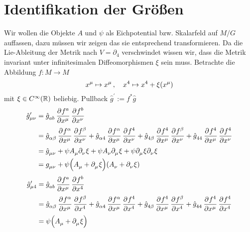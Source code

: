 \section{Identifikation der Größen}
Wir wollen die Objekte $A$ und $\psi$ als Eichpotential bzw. Skalarfeld auf
$M/G$ auffassen, dazu müssen wir zeigen das sie entsprechend transformieren.
Da die Lie-Ableitung der Metrik nach $V=\partial_4$ verschwindet wissen wir,
dass die Metrik invariant unter infinitesimalen Diffeomorphismen $\xi$ sein muss.
Betrachte die Abbildung $f:M\to M$ 
\begin{equation}
\tensor{x}{^\mu}\mapsto
\tensor{x}{^\mu}\,,\quad\tensor{x}{^4}\mapsto\tensor{x}{^4}+
\xi\left(\tensor{x}{^\mu}\right)
\end{equation}
mit $\xi\in C^\infty\left(\Reals\right)$ beliebig. 
Pullback $\hat{g}^\prime:=f^*\hat{g}$
\begin{equation}
\begin{split}
\tensor*{\hat{g}}{*^\prime_\mu_\nu}&=\tensor{\hat{g}}{_a_b}\dpd{f^a}{\tensor{x}{^\mu}}\dpd{f^b}{\tensor{x}{^\nu}}\\
&=\tensor{\hat{g}}{_\alpha_\beta}\dpd{f^\alpha}{\tensor{x}{^\mu}}\dpd{f^\beta}{\tensor{x}{^\nu}}
+\tensor{\hat{g}}{_\alpha_4}\dpd{f^\alpha}{\tensor{x}{^\mu}}\dpd{f^4}{\tensor{x}{^\nu}}
+\tensor{\hat{g}}{_4_\beta}\dpd{f^4}{\tensor{x}{^\mu}}\dpd{f^\beta}{\tensor{x}{^\nu}}
+\tensor{\hat{g}}{_4_4}\dpd{f^4}{\tensor{x}{^\mu}}\dpd{f^4}{\tensor{x}{^\nu}}
\\
&=\tensor{\hat{g}}{_\mu_\nu}
+\psi\tensor{A}{_\mu}\pdif{_\nu}\xi
+\psi\tensor{A}{_\nu}\pdif{_\mu}\xi
+\psi\pdif{_\mu}\xi\pdif{_\nu}\xi\\
&=\tensor{g}{_\mu_\nu}
+\psi\left(\tensor{A}{_\mu}+\pdif{_\mu}\xi\right)
\left(\tensor{A}{_\nu}+\pdif{_\nu}\xi\right)
\end{split}
\end{equation}
\begin{equation}
\begin{split}
\tensor*{\hat{g}}{*^\prime_\mu_4}&=\tensor{\hat{g}}{_a_b}\dpd{f^a}{\tensor{x}{^\mu}}\dpd{f^b}{\tensor{x}{^4}}\\
&=\tensor{\hat{g}}{_\alpha_\beta}\dpd{f^\alpha}{\tensor{x}{^\mu}}\dpd{f^\beta}{\tensor{x}{^4}}
+\tensor{\hat{g}}{_\alpha_4}\dpd{f^\alpha}{\tensor{x}{^\mu}}\dpd{f^4}{\tensor{x}{^4}}
+\tensor{\hat{g}}{_4_\beta}\dpd{f^4}{\tensor{x}{^\mu}}\dpd{f^\beta}{\tensor{x}{^4}}
+\tensor{\hat{g}}{_4_4}\dpd{f^4}{\tensor{x}{^\mu}}\dpd{f^4}{\tensor{x}{^4}}\\
&=\psi\left(\tensor{A}{_\mu}+\pdif{_\mu}\xi\right)
\end{split}
\end{equation}
